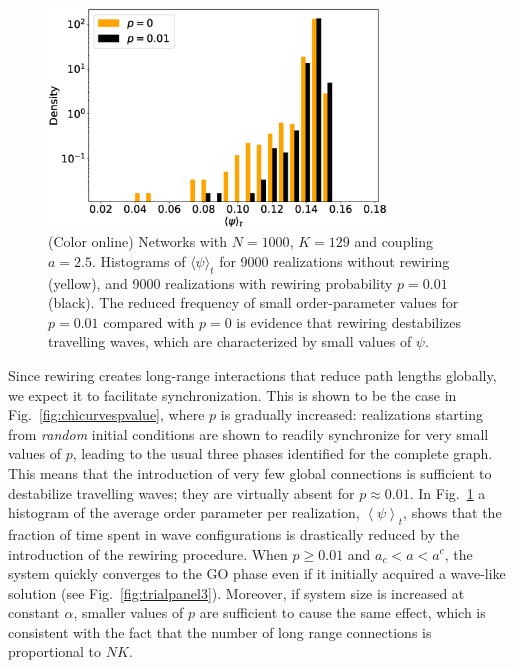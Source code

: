 \begin{figure}
\begin{center}
    \includegraphics[width=0.8\textwidth]{fig/chap2/articuno_figure_histogram.eps}
    \caption{\label{fig:histogram} (Color online) Networks with $N=1000$, $K=129$ and coupling $a=2.5$.  Histograms of $\langle \psi
        \rangle_t$ for 9000 realizations without rewiring (yellow), and 9000 realizations with rewiring probability $p=0.01$ (black).
        The reduced frequency of small order-parameter values for $p=0.01$ compared with $p=0$ is evidence that rewiring destabilizes
        travelling waves, which are characterized by small values of $\psi$.}
\end{center}
\end{figure}

Since rewiring creates long-range interactions that reduce path lengths globally, we expect it to facilitate synchronization. This is
shown to be the case in Fig.~\ref{fig:chicurvespvalue}, where $p$ is gradually increased: realizations starting from \textit{random}
initial conditions are shown to readily synchronize for very small values of $p$, leading to the usual three phases identified for the
complete graph. This means that the introduction of very few global connections is sufficient to destabilize travelling waves; they are
virtually absent for $p \approx 0.01$. In Fig.~\ref{fig:histogram} a histogram of the average order parameter per realization, $\left<
\psi \right>_t$, shows that the fraction of time spent in wave configurations is drastically reduced by the introduction of the
rewiring procedure. When $p\geq0.01$ and $a_c<a<a^c$, the system quickly converges to the  GO phase even if it initially acquired a
wave-like solution (see Fig.~\ref{fig:trialpanel3}). Moreover, if system size is increased at constant $\alpha$, smaller values of $p$
are sufficient to cause the same effect, which is consistent with the fact that the number of long range connections is proportional to
$NK$.

